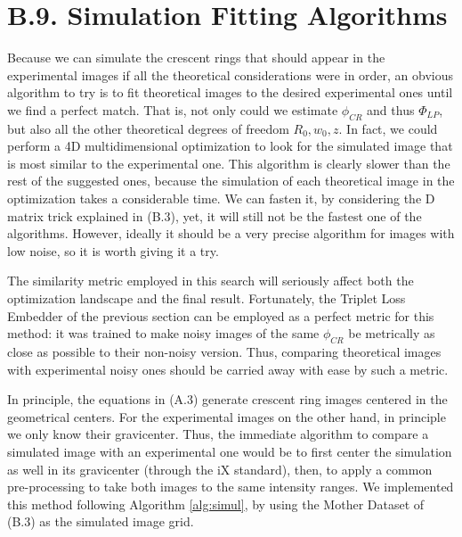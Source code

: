 \documentclass[11pt, a4paper, twoside]{article} %
\begin{document}
\section*{B.9. Simulation Fitting Algorithms}
Because we can simulate the crescent rings that should appear in the experimental images if all the theoretical considerations were in order, an obvious algorithm to try is to fit theoretical images to the desired experimental ones until we find a perfect match. That is, not only could we estimate $\phi_{CR}$ and thus $\Phi_{LP}$, but also all the other theoretical degrees of freedom $R_0,w_0,z$. In fact, we could perform a 4D multidimensional optimization to look for the simulated image that is most similar to the experimental one. This algorithm is clearly slower than the rest of the suggested ones, because the simulation of each theoretical image in the optimization takes a considerable time. We can fasten it, by considering the D matrix trick explained in (B.3), yet, it will still not be the fastest one of the algorithms. However, ideally it should be a very precise algorithm for images with low noise, so it is worth giving it a try. 

The similarity metric employed in this search will seriously affect both the optimization landscape and the final result. Fortunately, the Triplet Loss Embedder of the previous section can be employed as a perfect metric for this method: it was trained to make noisy images of the same $\phi_{CR}$ be metrically as close as possible to their non-noisy version. Thus, comparing theoretical images with experimental noisy ones should be carried away with ease by such a metric.

In principle, the equations in (A.3) generate crescent ring images centered in the geometrical centers. For the experimental images on the other hand, in principle we only know their gravicenter. Thus, the immediate algorithm to compare a simulated image with an experimental one would be to first center the simulation as well in its gravicenter (through the iX standard), then, to apply a common pre-processing to take both images to the same intensity ranges. We implemented this method following Algorithm \ref{alg:simul}, by using the Mother Dataset of (B.3) as the simulated image grid.
\end{document}
